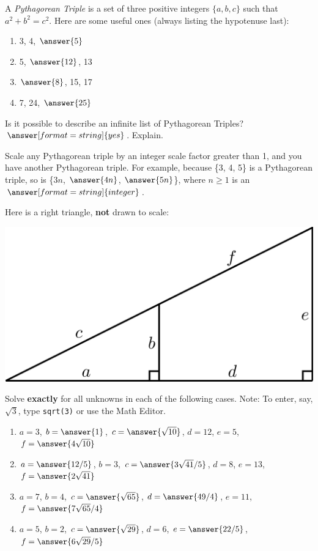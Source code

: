 \documentclass[nooutcomes]{ximera}
\begin{document}
\begin{question}
A \textit{Pythagorean Triple} is a set
  of three positive integers $\{a,b,c\}$ such that $a^2 + b^2 =
  c^2$. Here are some useful ones (always listing the hypotenuse last): 
\begin{enumerate}
\item 3, 4, $\answer{5}$
\item 5, $\answer{12}$, 13
\item $\answer{8}$, 15, 17
\item 7, 24, $\answer{25}$
\end{enumerate}
  Is it possible to describe an infinite list of Pythagorean Triples?  
  $\answer[format=string]{yes}$. 
  Explain. 
\begin{question}
Scale any Pythagorean triple by an integer scale factor greater than 1, and you have another Pythagorean triple.  For example, because \{3, 4, 5\} is a Pythagorean triple, so is \{$3n$, $\answer{4n}$, $\answer{5n}$\}, where $n \ge 1$ is an $\answer[format=string]{integer}$.  
\end{question}
\end{question}

\begin{question}
Here is a right triangle, \textbf{not} drawn to scale:
\begin{image}
\includegraphics{origamiSimQ.png}
\end{image}
Solve \textbf{exactly} for all unknowns in each of the following cases.  Note:  To enter, 
say, $\sqrt{3}$, type \texttt{sqrt(3)} or use the Math Editor. 
\begin{enumerate}
\item $a = 3$, $b = \answer{1}$, $c = \answer{\sqrt{10}}$, $d = 12$, $e = 5$, $f = \answer{4 \sqrt{10}}$
\item $a = \answer{12/5}$, $b = 3$, $c = \answer{3\sqrt{41}/5}$, $d =8$, $e = 13$, $f = \answer{2\sqrt{41}}$
\item $a = 7$, $b = 4$, $c = \answer{\sqrt{65}}$, $d =\answer{49/4}$, $e = 11$, $f = \answer{7\sqrt{65}/4}$
\item $a = 5$, $b = 2$, $c = \answer{\sqrt{29}}$, $d =6$, $e = \answer{22/5}$, $f = \answer{6\sqrt{29}/5}$
\end{enumerate}
\end{question}
\end{document}
